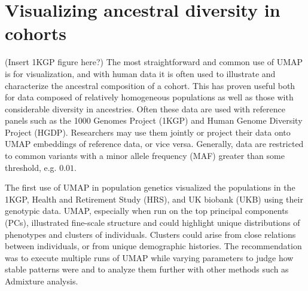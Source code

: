\documentclass[12pt]{article}
\begin{document}

\section*{Visualizing ancestral diversity in cohorts}
(Insert 1KGP figure here?)
The most straightforward and common use of UMAP is for visualization, and with human data it is often used to illustrate and characterize the ancestral composition of a cohort. This has proven useful both for data composed of relatively homogeneous populations as well as those with considerable diversity in ancestries. Often these data are used with reference panels such as the 1000 Genomes Project (1KGP)\cite{10002015global} and Human Genome Diversity Project (HGDP)\cite{cann2002human}. Researchers may use them jointly or project their data onto UMAP embeddings of reference data, or vice versa. Generally, data are restricted to common variants with a minor allele frequency (MAF) greater than some threshold, e.g. $0.01$.

The first use of UMAP in population genetics visualized the populations in the 1KGP, Health and Retirement Study (HRS)\cite{juster1995overview}, and UK biobank (UKB)\cite{sudlow2015uk} using their genotypic data. UMAP, especially when run on the top principal components (PCs), illustrated fine-scale structure and could highlight unique distributions of phenotypes and clusters of individuals. Clusters could arise from close relations between individuals, or from unique demographic histories. The recommendation was to execute multiple runs of UMAP while varying parameters to judge how stable patterns were and to analyze them further with other methods such as Admixture analysis\cite{diaz-papkovich_umap_2019}.
\end{document}
